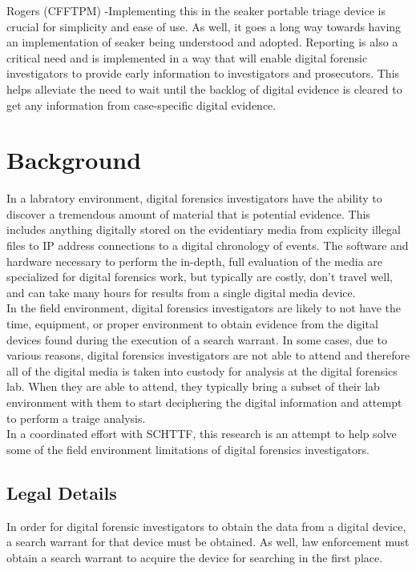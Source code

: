 \documentclass[12pt]{article}
\begin{document}
Rogers (CFFTPM) -Implementing this in the \gls{seaker} portable triage device is crucial for simplicity and ease of use.  As well, it goes a
long way towards having an implementation of \gls{seaker} being understood and adopted.  Reporting is also a critical need
and is implemented in a way that will enable digital forensic investigators to provide early information to
investigators and prosecutors.  This helps alleviate the need to wait until the backlog of digital evidence is cleared
to get any information from case-specific digital evidence.\\


\section{Background}
\label{sect-background}

In a labratory environment, digital forensics investigators have the ability to discover
a tremendous amount of material that is potential evidence.  This includes anything 
digitally stored on the evidentiary media from
explicity illegal files to IP address connections to a digital chronology of
events.\cite{raghavan2013digital}\cite{rogers2006computer}
The software and hardware necessary to perform the
in-depth, full evaluation of the media are specialized for digital forensics 
work, but typically are costly, don't travel well, and can take many hours for
results from a single digital media device.\\

In the field environment, digital forensics
investigators are likely to not have the time, equipment, or proper environment to
obtain evidence from the digital devices found during the execution of a search
warrant.  In some cases, due to various reasons, digital forensics investigators
are not able to attend and therefore all of the digital media is taken into
custody for analysis at the digital forensics lab.  When they are able to attend,
they typically
bring a subset of their lab environment with them to start deciphering
the digital information and attempt to perform a traige analysis.\\

In a coordinated effort with SCHTTF, this research is an attempt to help
solve some of the field environment limitations of digital forensics investigators.


\subsection{Legal Details}
In order for digital forensic investigators to obtain the data from a digital device,
a search warrant for that device must be obtained.  As well, law enforcement must
obtain a search warrant to acquire the device for searching in the first place.\\
\end{document}

